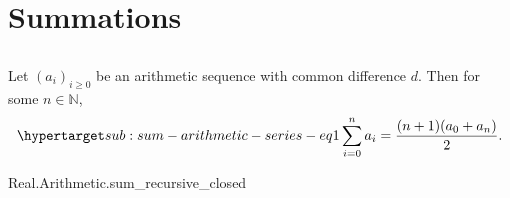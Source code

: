 \documentclass{article}
\begin{document}

\tableofcontents

\section{Summations}%

\subsection{}%

  Let $(a_i)_{i \geq 0}$ be an arithmetic sequence with common difference $d$.
    Then for some $n \in \mathbb{N}$,
    \begin{equation}
      \hyperlabel{sub:sum-arithmetic-series-eq1}
      \sum_{i=0}^n a_i = \frac{(n + 1)(a_0 + a_n)}{2}.
    \end{equation}

    {Real.Arithmetic.sum\_recursive\_closed}
\end{document}
